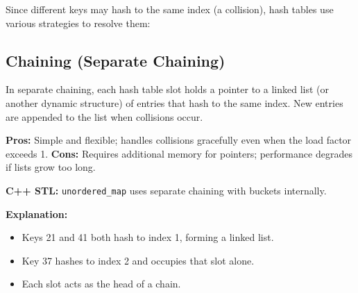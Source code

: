\documentclass{article}
\begin{document}
Since different keys may hash to the same index (a collision), hash tables use various strategies to resolve them:

\subsection{Chaining (Separate Chaining)}

In separate chaining, each hash table slot holds a pointer to a linked list (or another dynamic structure) of entries that hash to the same index. New entries are appended to the list when collisions occur.

\textbf{Pros:} Simple and flexible; handles collisions gracefully even when the load factor exceeds 1.  
\textbf{Cons:} Requires additional memory for pointers; performance degrades if lists grow too long.

\textbf{C++ STL:} \texttt{unordered\_map} uses separate chaining with buckets internally.

\begin{center}
\end{center}

\textbf{Explanation:}
\begin{itemize}
  \item Keys 21 and 41 both hash to index 1, forming a linked list.
  \item Key 37 hashes to index 2 and occupies that slot alone.
  \item Each slot acts as the head of a chain.
\end{itemize}
\end{document}
